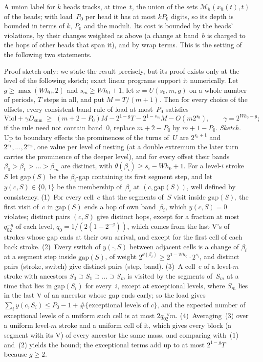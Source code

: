 A union label for $k$ heads tracks, at time~$t$, the union of the sets $\mathcal M_h(x_h(t),t)$ of the heads; with
load~$P_0$ per head it has at most $kP_0$ digits, so its depth is bounded in terms of $k$, $P_0$ and the moduli. Its
cost is bounded by the heads' violations, by their changes weighted as above (a change at band~$b$ is charged to the
hops of other heads that span it), and by wrap terms. This is the setting of the following two statements.

\begin{remark}\label{rem:dep-N}
Proof sketch only: we state the result precisely, but its proof exists only at the level of the following sketch;
exact linear programs support it numerically. Let
$g\ge\max(Wh_0,2)$ and $s_m\ge Wh_0+1$, let $x=U(s_0,m,g)$ on a whole number of periods, $T$ steps in all, and put
$M=T/(m+1)$. Then for every choice of the offsets, every consistent band rule of load at most~$P_0$ satisfies
\[
  \mathrm{Viol}+\gamma D_{\mathrm{sum}}\;\ge\;(m+2-P_0)M-2^{1-g}T-2^{1-s_m}M-O(m2^{s_0}),\qquad\gamma=2^{Wh_0-g};
\]
if the rule need not contain band~$0$, replace $m+2-P_0$ by $m+1-P_0$. \emph{Sketch.} Up to boundary effects the
prominences of the turns of~$U$ are $2^{s_0+1}$ and $2^{s_1},\dots,2^{s_m}$, one value per level of nesting (at a
double extremum the later turn carries the prominence of the deeper level), and for every offset their bands
$\beta_0>\beta_1>\dots>\beta_m$ are distinct, with $\theta(\beta_i)\ge s_i-Wh_0+1$. For a level-$i$ stroke~$S$ let
$\mathrm{gap}(S)$ be the $\beta_i$-gap containing its first segment step, and let $y(c,S)\in\{0,1\}$ be the membership
of~$\beta_i$ at $(c,\mathrm{gap}(S))$, well defined by consistency. (1)~For every cell~$c$ that the segments of~$S$
visit inside $\mathrm{gap}(S)$, the first visit of~$c$ in $\mathrm{gap}(S)$ ends a hop of own band~$\beta_i$, which
$y(c,S)=0$ violates; distinct pairs $(c,S)$ give distinct hops, except for a fraction at most $q_02^{-g}$ of each
level, $q_0=1/(2(1-2^{-g}))$, which comes from the last V's of strokes whose gap ends at their own arrival, and except
for the first cell of each back stroke. (2)~Every switch of $y(\cdot,S)$ between adjacent cells is a change of
$\beta_i$ at a segment step inside $\mathrm{gap}(S)$, of weight $2^{\theta(\beta_i)}\ge2^{1-Wh_0}\cdot2^{s_i}$, and
distinct pairs (stroke, switch) give distinct pairs (step, band). (3)~A cell~$c$ of a level-$m$ stroke with ancestors
$S_0\supset S_1\supset\dots\supset S_m$ is visited by the segments of~$S_m$ at a time that lies in $\mathrm{gap}(S_i)$
for every~$i$, except at exceptional levels, where $S_m$ lies in the last V of an ancestor whose gap ends early; so
the load gives $\sum_iy(c,S_i)\le P_0-1+\#\{\text{exceptional levels of }c\}$, and the expected number of exceptional
levels of a uniform such cell is at most $2q_02^{-g}m$. (4)~Averaging~(3) over a uniform level-$m$ stroke and a
uniform cell of it, which gives every block (a segment with its V) of every ancestor the same mass, and comparing
with~(1) and~(2) yields the bound; the exceptional terms add up to at most $2^{1-g}T$ because $g\ge2$.


\end{remark}
